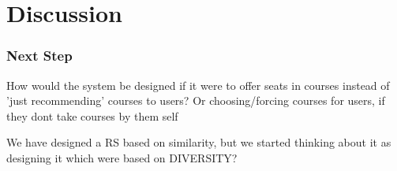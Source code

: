 \section{Discussion}
\subsubsection{Next Step}
How would the system be designed if it were to offer seats in courses instead of 'just recommending' courses to users? Or choosing/forcing courses for users, if they dont take courses by them self

We have designed a RS based on similarity, but we started thinking about it as designing it which were based on DIVERSITY?
